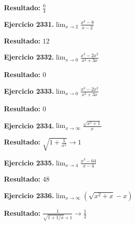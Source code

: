 \documentclass[10pt,a4paper]{article}
\begin{document}
\begin{solbox}
\textbf{Resultado:} \(\displaystyle \frac{6}{4}\)
\end{solbox}

\begin{ejbox}
\textbf{Ejercicio 2331.}\quad $\lim_{x\to 2} \frac{x^3-8}{x-2}$
\end{ejbox}

\begin{solbox}
\textbf{Resultado:} \(\displaystyle 12\)
\end{solbox}

\begin{ejbox}
\textbf{Ejercicio 2332.}\quad $\lim_{x\to 0} \frac{x^3-2x^2}{x^2+3x}$
\end{ejbox}

\begin{solbox}
\textbf{Resultado:} \(\displaystyle 0\)
\end{solbox}

\newpage
\begin{ejbox}
\textbf{Ejercicio 2333.}\quad $\lim_{x\to 0} \frac{x^3-2x^2}{x^2+3x}$
\end{ejbox}

\begin{solbox}
\textbf{Resultado:} \(\displaystyle 0\)
\end{solbox}

\begin{ejbox}
\textbf{Ejercicio 2334.}\quad $\lim_{x\to \infty} \frac{\sqrt{x^2+1}}{x}$
\end{ejbox}

\begin{solbox}
\textbf{Resultado:} \(\displaystyle \sqrt{1+\frac{1}{x^2}} \to 1\)
\end{solbox}

\begin{ejbox}
\textbf{Ejercicio 2335.}\quad $\lim_{x\to 4} \frac{x^3-64}{x-4}$
\end{ejbox}

\begin{solbox}
\textbf{Resultado:} \(\displaystyle 48\)
\end{solbox}

\newpage
\begin{ejbox}
\textbf{Ejercicio 2336.}\quad $\lim_{x\to \infty} (\sqrt{x^2+x} - x)$
\end{ejbox}

\begin{solbox}
\textbf{Resultado:} \(\displaystyle \frac{1}{\sqrt{1+1/x}+1} \to \frac{1}{2}\)
\end{solbox}
\end{document}
